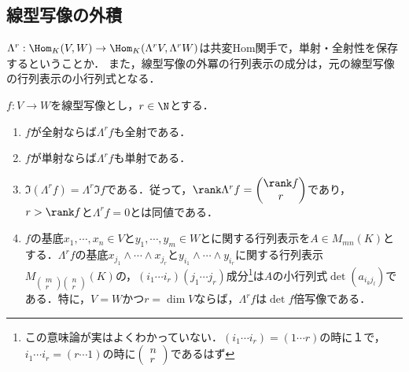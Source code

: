 \documentclass[uplatex,dvipdfmx]{jsreport}
\begin{document}
\subsection{線型写像の外積}

\begin{tcolorbox}[colframe=ForestGreen, colback=ForestGreen!10!white, breakable,
    title=線型写像の外積の構成は共変Hom関手]
    $\Lambda^r:\Hom_K(V,W)\to\Hom_K(\Lambda^rV,\Lambda^rW)$は共変Hom関手で，単射・全射性を保存するということか．
    また，線型写像の外冪の行列表示の成分は，元の線型写像の行列表示の小行列式となる．
\end{tcolorbox}

\begin{proposition}[線型写像の外積の構成は共変Hom関手]
    $f:V\to W$を線型写像とし，$r\in\N$とする．
    \begin{enumerate}
        \item $f$が全射ならば$\Lambda^rf$も全射である．
        \item $f$が単射ならば$\Lambda^rf$も単射である．
        \item $\Im(\Lambda^rf)=\Lambda^r\Im f$である．従って，$\rank\Lambda^rf=\begin{pmatrix}\rank f\\r\end{pmatrix}$であり，$r>\rank f$と$\Lambda^rf=0$とは同値である．
        \item $f$の基底$x_1,\cdots,x_n\in V$と$y_1,\cdots,y_m\in W$とに関する行列表示を$A\in M_{mn}(K)$とする．$\Lambda^rf$の基底$x_{j_1}\wedge\cdots\wedge x_{j_r}$と$y_{i_1}\wedge\cdots\wedge y_{i_r}$に関する行列表示$M_{\begin{pmatrix}m\\r\end{pmatrix}\begin{pmatrix}n\\r\end{pmatrix}}(K)$の，$(i_1\cdots i_r)(j_1\cdots j_r)$成分\footnote{この意味論が実はよくわかっていない．$(i_1\cdots i_r)=(1\cdots r)$の時に１で，$i_1\cdots i_r=(r\cdots 1)$の時に$\begin{pmatrix}n\\r\end{pmatrix}$であるはず}は$A$の小行列式$\det(a_{i_kj_l})$である．特に，$V=W$かつ$r=\dim V$ならば，$\Lambda^rf$は$\det f$倍写像である．
    \end{enumerate}
\end{proposition}
\end{document}
